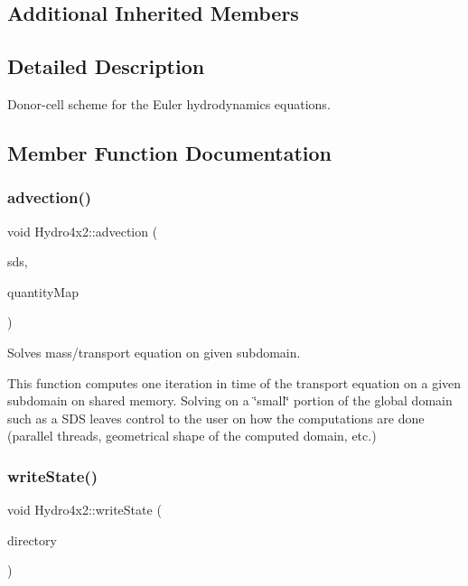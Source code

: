 \subsection*{Additional Inherited Members}


\subsection{Detailed Description}
Donor-\/cell scheme for the Euler hydrodynamics equations. 

\subsection{Member Function Documentation}
\mbox{\label{classHydro4x2_a9a6b67fe9d9ce8319bce856d99b2829e}} 
\subsubsection{\texorpdfstring{advection()}{advection()}}
{\footnotesize\ttfamily void Hydro4x2\+::advection (\begin{DoxyParamCaption}\item[{const \mbox{\hyperlink{classSDShared}{S\+D\+Shared}} \&}]{sds,  }\item[{const std\+::map$<$ std\+::string, \mbox{\hyperlink{classQuantity}{Quantity}}$<$ real $>$ $\ast$ $>$ \&}]{quantity\+Map }\end{DoxyParamCaption})}



Solves mass/transport equation on given subdomain. 

This function computes one iteration in time of the transport equation on a given subdomain on shared memory. Solving on a \char`\"{}small\char`\"{} portion of the global domain such as a S\+DS leaves control to the user on how the computations are done (parallel threads, geometrical shape of the computed domain, etc.) \mbox{\label{classHydro4x2_a9c39291599196f2e3ff57bd416488edb}} 
\subsubsection{\texorpdfstring{write\+State()}{writeState()}\hspace{0.1cm}{\footnotesize\ttfamily [1/2]}}
{\footnotesize\ttfamily void Hydro4x2\+::write\+State (\begin{DoxyParamCaption}\item[{std\+::string}]{directory }\end{DoxyParamCaption})}



